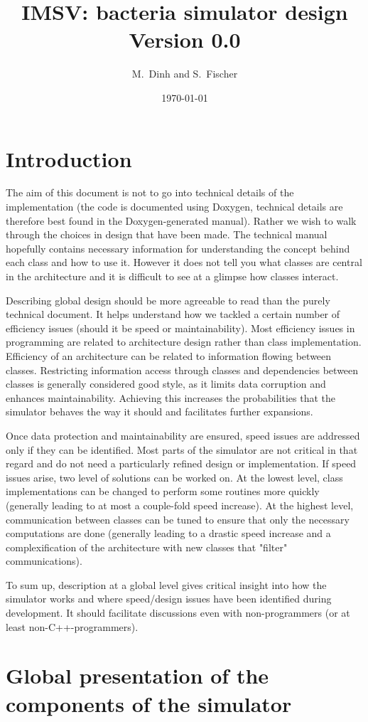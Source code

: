 \documentclass[12pt]{article}
\theoremstyle{definition}
\theoremstyle{remark}
\numberwithin{equation}{section}
\begin{document}
\normalem

\title{{IMSV}: bacteria simulator design \\ Version 0.0}%
\author{M.~Dinh and S.~Fischer}%
\date{\today}%

\newpage

\tableofcontents

\newpage

\section{Introduction}

The aim of this document is not to go into technical details of the implementation (the code is documented using Doxygen, technical details are therefore best found in the Doxygen-generated manual). Rather we wish to walk through the choices in design that have been made. The technical manual hopefully contains necessary information for understanding the concept behind each class and how to use it. However it does not tell you what classes are central in the architecture and it is difficult to see at a glimpse how classes interact.

Describing global design should be more agreeable to read than the purely technical document. It helps understand how we tackled a certain number of efficiency issues (should it be speed or maintainability). Most efficiency issues in programming are related to architecture design rather than class implementation. Efficiency of an architecture can be related to information flowing between classes. Restricting information access through classes and dependencies between classes is generally considered good style, as it limits data corruption and enhances maintainability. Achieving this increases the probabilities that the simulator behaves the way it should and facilitates further expansions.

Once data protection and maintainability are ensured, speed issues are addressed only if they can be identified. Most parts of the simulator are not critical in that regard and do not need a particularly refined design or implementation. If speed issues arise, two level of solutions can be worked on. At the lowest level, class implementations can be changed to perform some routines more quickly (generally leading to at most a couple-fold speed increase). At the highest level, communication between classes can be tuned to ensure that only the necessary computations are done (generally leading to a drastic speed increase and a complexification of the architecture with new classes that "filter" communications).

To sum up, description at a global level gives critical insight into how the simulator works and where speed/design issues have been identified during development. It should facilitate discussions even with non-programmers (or at least non-C++-programmers).

\section{Global presentation of the components of the simulator}

\clearpage
\end{document}
